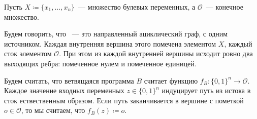 \begin{definition*}
    Пусть $X \coloneqq \{x_1, \dots, x_n\}$~--- множество булевых переменных, а $\mathcal{O}$~---
    конечное множество.
    
    Будем говорить, что ~--- это направленный ациклический граф, с одним
    источником. Каждая внутренняя вершина этого помечена элементом $X$, каждый сток элементом
    $\mathcal{O}$. При этом из каждой внутренней вершины исходит ровно два выходящих ребра: помеченное
    нулем и помеченное единицей.

    Будем считать, что ветвящаяся программа $B$ считает функцию $f_{B}\colon \{0, 1\}^n \to
    \mathcal{O}$. Каждое значение входных переменных $z \in \{0, 1\}^n$ индуцирует путь из истока в сток
    ествественным образом. Если путь заканчивается в вершине с пометкой $o \in \mathcal{O}$, то мы
    считаем, что $f_B(z) \coloneqq o$.
\end{definition*}

